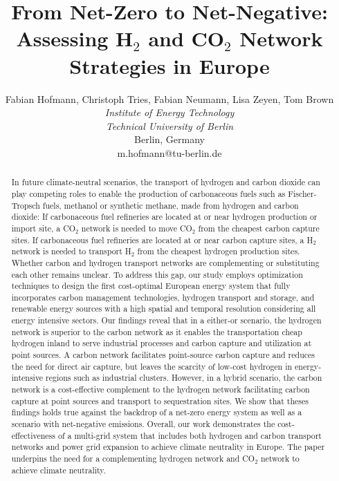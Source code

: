 \documentclass[twocolumn]{article}
\newcommand{\carbon}{CO$_2$}
\newcommand{\hydrogen}{H$_2$}
\begin{document}


\title{From Net-Zero to Net-Negative: Assessing \hydrogen{} and \carbon{} Network Strategies in Europe}

\author{
    Fabian Hofmann, Christoph Tries, Fabian Neumann, Lisa Zeyen, Tom Brown \\
    \textit{Institute of Energy Technology} \\
    \textit{Technical University of Berlin}\\
    Berlin, Germany \\
    m.hofmann@tu-berlin.de
}


\maketitle

\begin{abstract}
    In future climate-neutral scenarios, the transport of hydrogen and carbon dioxide can play competing roles to enable the production of carbonaceous fuels such as Fischer-Tropsch fuels, methanol or synthetic methane, made from hydrogen and carbon dioxide: If carbonaceous fuel refineries are located at or near hydrogen production or import site, a \carbon{} network is needed to move \carbon{} from the cheapest carbon capture sites. If carbonaceous fuel refineries are located at or near carbon capture sites, a \hydrogen{} network is needed to transport \hydrogen{} from the cheapest hydrogen production sites. Whether carbon and hydrogen transport networks are complementing or substituting each other remains unclear.
    To address this gap, our study employs optimization techniques to design the first cost-optimal European energy system that fully incorporates carbon management technologies, hydrogen transport and storage, and renewable energy sources with a high spatial and temporal resolution considering all energy intensive sectors.
    Our findings reveal that in a either-or scenario, the hydrogen network is superior to the carbon network as it enables the transportation cheap hydrogen inland to serve industrial processes and carbon capture and utilization at point sources. A carbon network facilitates point-source carbon capture and reduces the need for direct air capture, but leaves the scarcity of low-cost hydrogen in energy-intensive regions such as industrial clusters.
    However, in a hybrid scenario, the carbon network is a cost-effective complement to the hydrogen network facilitating carbon capture at point sources and transport to sequestration sites.
    We show that theses findings holds true against the backdrop of a net-zero energy system as well as a scenario with net-negative emissions.
    Overall, our work demonstrates the cost-effectiveness of a multi-grid system that includes both hydrogen and carbon transport networks and power grid expansion to achieve climate neutrality in Europe.
    The paper underpins the need for a complementing hydrogen network and \carbon{} network to achieve climate neutrality.
\end{abstract}
\end{document}
